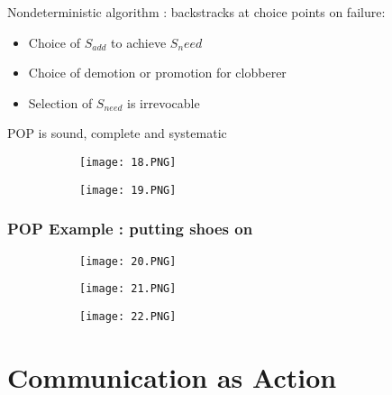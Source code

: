 \documentclass{article}
\begin{document}
Nondeterministic algorithm : backstracks at choice points on failure:

\begin{itemize}
    \item Choice of $S_{add}$ to achieve $S_need$
    \item Choice of demotion or promotion for clobberer
    \item Selection of $S_{need}$ is irrevocable
\end{itemize}

POP is sound, complete and systematic

\begin{figure}[ht!]
  \centering
  \begin{subfigure}[b]{0.5\linewidth}
    \texttt{[image: 18.PNG]}
  \end{subfigure}
     \begin{subfigure}[b]{0.49\textwidth}
         \centering
         \texttt{[image: 19.PNG]}
     \end{subfigure}
\end{figure}



\subsubsection{POP Example : putting shoes on}

\begin{figure}[ht!]
  \centering
  \begin{subfigure}[b]{0.5\linewidth}
    \texttt{[image: 20.PNG]}
  \end{subfigure}
     \begin{subfigure}[b]{0.49\textwidth}
         \centering
         \texttt{[image: 21.PNG]}
     \end{subfigure}
\end{figure}

\begin{figure}[ht!]
  \centering
  \begin{subfigure}[b]{0.6\linewidth}
    \texttt{[image: 22.PNG]}
  \end{subfigure}
\end{figure}

\section{Communication as Action}
\end{document}
